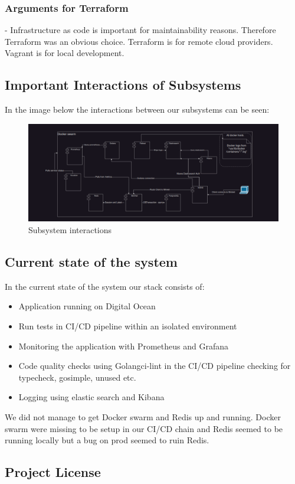 \subsubsection{Arguments for Terraform}
- Infrastructure as code is important for maintainability reasons. Therefore Terraform was an obvious choice.
Terraform is for remote cloud providers. Vagrant is for local development. 

\subsection{Important Interactions of Subsystems}
In the image below the interactions between our subsystems can be seen:

\begin{figure}[H]
    \centering
    \captionsetup{justification=centering,margin=1cm}
    \includegraphics[width=0.8\linewidth]{report/images/InteractionsOfSystems.png}
    \caption{Subsystem interactions}
    \label{fig:minitwit}
\end{figure}

\subsection{Current state of the system}
In the current state of the system our stack consists of: 
\begin{itemize}
    \item Application running on Digital Ocean
    \item Run tests in CI/CD pipeline within an isolated environment
    \item Monitoring the application with Prometheus and Grafana
    \item Code quality checks using Golangci-lint in the CI/CD pipeline checking for typecheck, gosimple, unused etc.
    \item Logging using elastic search and Kibana
\end{itemize}
We did not manage to get Docker swarm and Redis up and running. Docker swarm were missing to be setup 
in our CI/CD chain and Redis seemed to be running locally but a bug on prod seemed to ruin Redis.

\subsection{Project License}
